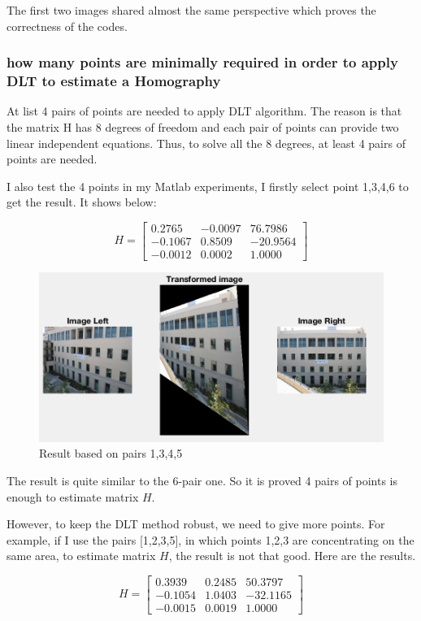 \documentclass{article}
\begin{document}
The first two images shared almost the same perspective which proves the correctness of the codes.

\subsubsection*{how many points are minimally required in order to apply DLT to estimate a Homography}

At list 4 pairs of points are needed to apply DLT algorithm. The reason is that the matrix H has 8 degrees of freedom and each pair of points can provide two linear independent equations. Thus, to solve all the 8 degrees, at least 4 pairs of points are needed.

I also test the 4 points in my Matlab experiments, I firstly select point 1,3,4,6 to get the result. It shows below:

$$H = \begin{bmatrix} 0.2765 & -0.0097 & 76.7986 \\ -0.1067 & 0.8509 & -20.9564 \\ -0.0012 & 0.0002 & 1.0000 \end{bmatrix} $$

\begin{figure}[htbp]
    \centering
    \includegraphics[scale = 0.6]{t2_3.png}
    \caption{Result based on pairs 1,3,4,5}
    \label{fig29}
\end{figure}

The result is quite similar to the 6-pair one. So it is proved 4 pairs of points is enough to estimate matrix $H$.

However, to keep the DLT method robust, we need to give more points. For example, if I use the pairs [1,2,3,5], in which points 1,2,3 are concentrating on the same area, to estimate matrix $H$, the result is not that good. Here are the results.

$$H = \begin{bmatrix} 0.3939 & 0.2485 & 50.3797 \\ -0.1054 & 1.0403 & -32.1165 \\ -0.0015 & 0.0019 & 1.0000 \end{bmatrix} $$
\end{document}
